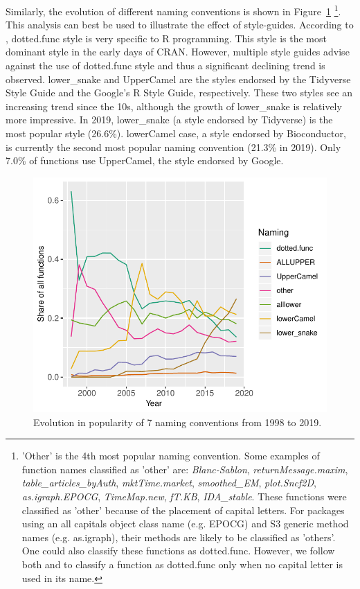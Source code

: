 Similarly, the evolution of different naming conventions is shown in Figure~\ref{figure:fig2} \footnote{'Other' is the 4th most popular naming convention. Some examples of function names classified as 'other' are: \emph{Blanc-Sablon}, \emph{returnMessage.maxim}, \emph{table\_articles\_byAuth}, \emph{mktTime.market}, \emph{smoothed\_EM}, \emph{plot.Sncf2D}, \emph{as.igraph.EPOCG}, \emph{TimeMap.new}, \emph{fT.KB}, \emph{IDA\_stable}. These functions were classified as 'other' because of the placement of capital letters. For packages using an all capitals object class name (e.g. EPOCG) and S3 generic method names (e.g. as.igraph), their methods are likely to be classified as 'others'. One could also classify these functions as dotted.func. However, we follow both  and \citet{baaaath} to classify a function as dotted.func only when no capital letter is used in its name.}. This analysis can best be used to illustrate the effect of style-guides. According to \citet{baaaath}, dotted.func style is very specific to R programming. This style is the most dominant style in the early days of CRAN. However, multiple style guides advise against the use of dotted.func style and thus a significant declining trend is observed. lower\_snake and UpperCamel are the styles endorsed by the Tidyverse Style Guide and the Google's R Style Guide, respectively. These two styles see an increasing trend since the 10s, although the growth of lower\_snake is relatively more impressive. In 2019, lower\_snake (a style endorsed by Tidyverse) is the most popular style (26.6\%). lowerCamel case, a style endorsed by Bioconductor, is currently the second most popular naming convention (21.3\% in 2019). Only 7.0\% of functions use UpperCamel, the style endorsed by Google.

\begin{figure}[htbp]
  \centering
  \includegraphics{fig2}
  \caption{Evolution in popularity of 7 naming conventions from 1998 to 2019.}
  \label{figure:fig2}
\end{figure}

